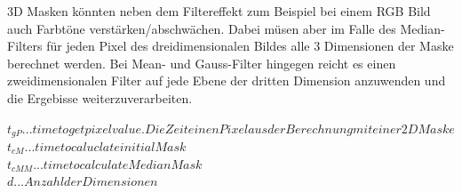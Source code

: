 \documentclass[12pt,german]{article}
\begin{document}
3D Masken könnten neben dem Filtereffekt zum Beispiel bei einem RGB Bild auch Farbtöne verstärken/abschwächen. Dabei müsen aber im Falle des Median-Filters für jeden Pixel des dreidimensionalen Bildes alle 3 Dimensionen der Maske berechnet werden. Bei Mean- und Gauss-Filter hingegen reicht es einen zweidimensionalen Filter auf jede Ebene der dritten Dimension anzuwenden und die Ergebisse weiterzuverarbeiten. 


\begin{center}
	$t_{gP} ... time to get pixel value. Die Zeit einen Pixel aus der Berechnung mit einer 2D Maske  $ \\
	$t_{cM} ... time to caluclate initial Mask$ \\
	$t_{cMM} ... time to calculate MedianMask $ \\
	$d ... Anzahl der Dimensionen$ \\
\end{center}
\end{document}
